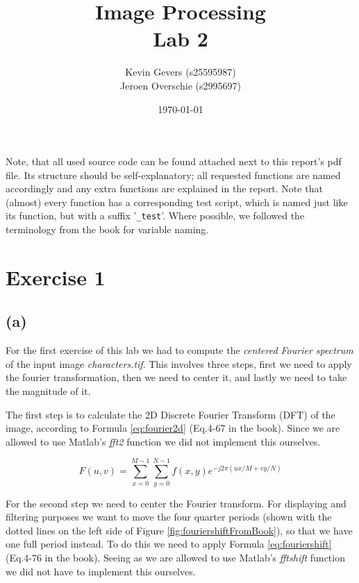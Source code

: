 \documentclass{article}
\title{Image Processing\\
    Lab 2}
\author{Kevin Gevers (s25595987) \\ Jeroen Overschie (s2995697)}
\date{\today}
\begin{document}
\maketitle

Note, that all used source code can be found attached next to this report's pdf file. Its structure should be self-explanatory; all requested functions are named accordingly and any extra functions are explained in the report. Note that (almost) every function has a corresponding test script, which is named just like its function, but with a suffix '\texttt{\_test}'. Where possible, we followed the terminology from the book \citep{gonzalez2008digital} for variable naming.

\section*{Exercise 1}
\subsection*{(a)}
For the first exercise of this lab we had to compute the \textit{centered Fourier spectrum} of the input image \textit{characters.tif}. This involves three steps, first we need to apply the fourier transformation, then we need to center it, and lastly we need to take the magnitude of it. 

The first step is to calculate the 2D Discrete Fourier Transform (DFT) of the image, according to Formula \ref{eq:fourier2d} (Eq.4-67 in the book). Since we are allowed to use Matlab's \textit{fft2} function we did not implement this ourselves.

\begin{equation}\label{eq:fourier2d}
    F(u, v)=\sum_{x=0}^{M-1} \sum_{y=0}^{N-1} f(x, y) e^{-j 2 \pi(u x / M+v y / N)}
\end{equation}

For the second step we need to center the Fourier transform. For displaying and filtering purposes we want to move the four quarter periods (shown with the dotted lines on the left side of Figure \ref{fig:fouriershiftFromBook}), so that we have one full period instead. To do this we need to apply Formula \ref{eq:fouriershift} (Eq.4-76 in the book). Seeing as we are allowed to use Matlab's \textit{fftshift} function we did not have to implement this ourselves.
\end{document}
